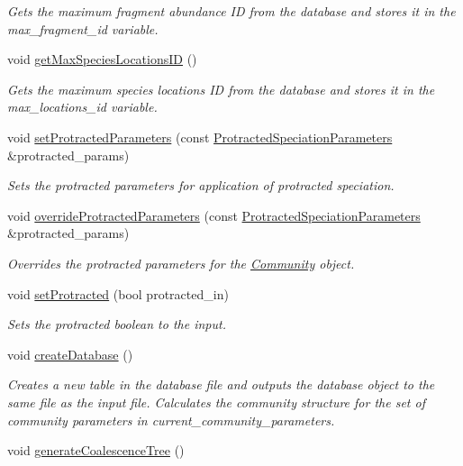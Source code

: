 \begin{DoxyCompactItemize}
\begin{DoxyCompactList}\small\item\em Gets the maximum fragment abundance ID from the database and stores it in the max\+\_\+fragment\+\_\+id variable. \end{DoxyCompactList}\item 
void \hyperlink{class_community_a04d65ed53ea9e2cb6ce02dddccf3d33e}{get\+Max\+Species\+Locations\+ID} ()
\begin{DoxyCompactList}\small\item\em Gets the maximum species locations ID from the database and stores it in the max\+\_\+locations\+\_\+id variable. \end{DoxyCompactList}\item 
void \hyperlink{class_community_aca6eb26336c882ac41601ef06495f421}{set\+Protracted\+Parameters} (const \hyperlink{struct_protracted_speciation_parameters}{Protracted\+Speciation\+Parameters} \&protracted\+\_\+params)
\begin{DoxyCompactList}\small\item\em Sets the protracted parameters for application of protracted speciation. \end{DoxyCompactList}\item 
void \hyperlink{class_community_a9fa7f842fc8b5bcd15d48010b1a58178}{override\+Protracted\+Parameters} (const \hyperlink{struct_protracted_speciation_parameters}{Protracted\+Speciation\+Parameters} \&protracted\+\_\+params)
\begin{DoxyCompactList}\small\item\em Overrides the protracted parameters for the \hyperlink{class_community}{Community} object. \end{DoxyCompactList}\item 
void \hyperlink{class_community_a649afbf07398a1717ad49cb22bb744ff}{set\+Protracted} (bool protracted\+\_\+in)
\begin{DoxyCompactList}\small\item\em Sets the protracted boolean to the input. \end{DoxyCompactList}\item 
void \hyperlink{class_community_ad6e92dafaf00fd65cc29ca436dc61a2e}{create\+Database} ()
\begin{DoxyCompactList}\small\item\em Creates a new table in the database file and outputs the database object to the same file as the input file. Calculates the community structure for the set of community parameters in current\+\_\+community\+\_\+parameters. \end{DoxyCompactList}\item 
void \hyperlink{class_community_a078a9a1210d6b7e8f6f378891f7e8b86}{generate\+Coalescence\+Tree} ()\hypertarget{class_community_a078a9a1210d6b7e8f6f378891f7e8b86}{}\label{class_community_a078a9a1210d6b7e8f6f378891f7e8b86}


\end{DoxyCompactItemize}
